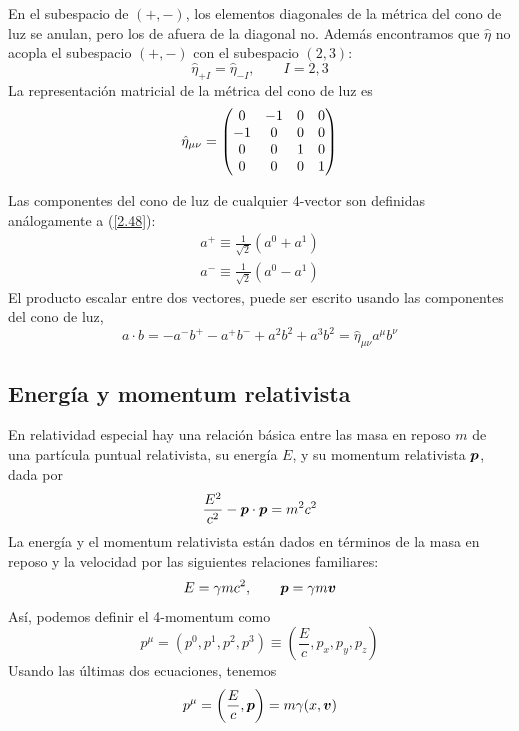 En el subespacio de $(+,-)$, los elementos diagonales de la métrica del cono de luz se anulan, pero los de afuera de la diagonal no. Además encontramos que $\hat{\eta}$ no acopla el subespacio $(+,-)$ con el subespacio $(2,3)$:
\begin{equation}
    \hat{\eta}_{+I}=\hat{\eta}_{-I},\qquad I=2,3
\end{equation}
La representación matricial de la métrica del cono de luz es
\begin{equation}
    \hat{\eta}_{\mu\nu}=\mqty(0&-1&0&0\\-1&0&0&0\\0&0&1&0\\0&0&0&1)
\end{equation}

Las componentes del cono de luz de cualquier 4-vector son definidas análogamente a (\ref{2.48}):
\begin{equation}\label{2.56}
\begin{split}
    a^+\equiv\frac{1}{\sqrt{2}}(a^0+a^1)\\
    a^-\equiv\frac{1}{\sqrt{2}}(a^0-a^1)
\end{split}
\end{equation}
El producto escalar entre dos vectores, puede ser escrito usando las componentes del cono de luz,
\begin{equation}
    \boxed{a\cdot b=-a^-b^+-a^+b^-+a^2b^2+a^3b^2=\hat{\eta}_{\mu\nu}a^\mu b^\nu}
\end{equation}



\subsection{Energía y momentum relativista}
En relatividad especial hay una relación básica entre las masa en reposo $m$ de una partícula puntual relativista, su energía $E$, y su momentum relativista $\vb*{p}$, dada por
\begin{equation}
    \frac{E^2}{c^2}-\vb*{p}\cdot\vb*{p}=m^2c^2
\end{equation}
La energía y el momentum relativista están dados en términos de la masa en reposo y la velocidad por las siguientes relaciones familiares:
\begin{equation}
    E=\gamma mc^2,\qquad \vb*{p}=\gamma m\vb*{v}
\end{equation}
Así, podemos definir el 4-momentum como
\begin{equation}
    p^\mu=(p^0,p^1,p^2,p^3)\equiv\left(\frac{E}{c},p_x,p_y,p_z\right)
\end{equation}
Usando las últimas dos ecuaciones, tenemos
\begin{equation}
    p^\mu=\left(\frac{E}{c},\vb*{p}\right)=m\gamma(x,\vb*{v})
\end{equation}





